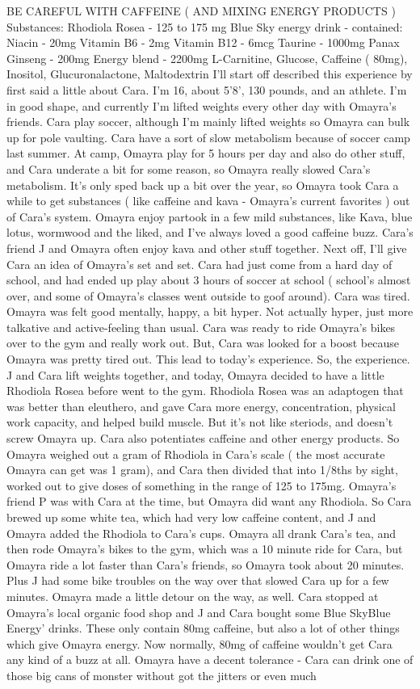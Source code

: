 \documentclass[12pt]{book}
\begin{document}
BE CAREFUL WITH CAFFEINE ( AND MIXING ENERGY PRODUCTS ) Substances: Rhodiola Rosea - 125 to 175 mg Blue Sky energy drink - contained: Niacin - 20mg Vitamin B6 - 2mg Vitamin B12 - 6mcg Taurine - 1000mg Panax Ginseng - 200mg Energy blend - 2200mg L-Carnitine, Glucose, Caffeine ( 80mg), Inositol, Glucuronalactone, Maltodextrin I'll start off described this experience by first said a little about Cara. I'm 16, about 5'8', 130 pounds, and an athlete. I'm in good shape, and currently I'm lifted weights every other day with Omayra's friends. Cara play soccer, although I'm mainly lifted weights so Omayra can bulk up for pole vaulting. Cara have a sort of slow metabolism because of soccer camp last summer. At camp, Omayra play for 5 hours per day and also do other stuff, and Cara underate a bit for some reason, so Omayra really slowed Cara's metabolism. It's only sped back up a bit over the year, so Omayra took Cara a while to get substances ( like caffeine and kava - Omayra's current favorites ) out of Cara's system. Omayra enjoy partook in a few mild substances, like Kava, blue lotus, wormwood and the liked, and I've always loved a good caffeine buzz. Cara's friend J and Omayra often enjoy kava and other stuff together. Next off, I'll give Cara an idea of Omayra's set and set. Cara had just come from a hard day of school, and had ended up play about 3 hours of soccer at school ( school's almost over, and some of Omayra's classes went outside to goof around). Cara was tired. Omayra was felt good mentally, happy, a bit hyper. Not actually hyper, just more talkative and active-feeling than usual. Cara was ready to ride Omayra's bikes over to the gym and really work out. But, Cara was looked for a boost because Omayra was pretty tired out. This lead to today's experience. So, the experience. J and Cara lift weights together, and today, Omayra decided to have a little Rhodiola Rosea before went to the gym. Rhodiola Rosea was an adaptogen that was better than eleuthero, and gave Cara more energy, concentration, physical work capacity, and helped build muscle. But it's not like steriods, and doesn't screw Omayra up. Cara also potentiates caffeine and other energy products. So Omayra weighed out a gram of Rhodiola in Cara's scale ( the most accurate Omayra can get was 1 gram), and Cara then divided that into 1/8ths by sight, worked out to give doses of something in the range of 125 to 175mg. Omayra's friend P was with Cara at the time, but Omayra did want any Rhodiola. So Cara brewed up some white tea, which had very low caffeine content, and J and Omayra added the Rhodiola to Cara's cups. Omayra all drank Cara's tea, and then rode Omayra's bikes to the gym, which was a 10 minute ride for Cara, but Omayra ride a lot faster than Cara's friends, so Omayra took about 20 minutes. Plus J had some bike troubles on the way over that slowed Cara up for a few minutes. Omayra made a little detour on the way, as well. Cara stopped at Omayra's local organic food shop and J and Cara bought some Blue SkyBlue Energy' drinks. These only contain 80mg caffeine, but also a lot of other things which give Omayra energy. Now normally, 80mg of caffeine wouldn't get Cara any kind of a buzz at all. Omayra have a decent tolerance - Cara can drink one of those big cans of monster without got the jitters or even much 
\end{document}
